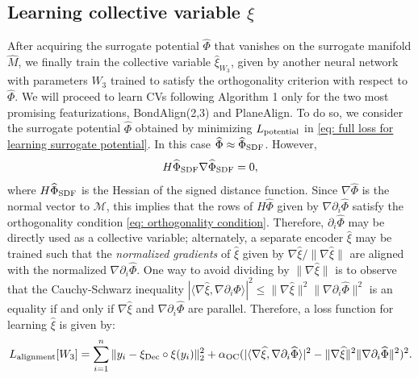 \documentclass[reqno, 12pt]{article}
\begin{document}
\subsection{Learning collective variable $\xi$} After acquiring the surrogate potential $\widehat{\Phi}$ that vanishes on the surrogate manifold $\widehat{M}$, we finally train the collective variable $\widehat{\xi}_{W_3}$, given by another neural network with parameters $W_3$ trained to satisfy the orthogonality criterion with respect to $\widehat{\Phi}$. We will proceed to learn CVs following Algorithm 1 only for the two most promising featurizations, {\sf BondAlign(2,3)} and {\sf PlaneAlign}. To do so, we consider the surrogate potential $\widehat{\Phi}$ obtained by minimizing $L_{\rm potential}$ in \eqref{eq: full loss for learning surrogate potential}. In this case $\widehat{\Phi} \approx \widehat{\Phi}_{\rm SDF}$.  However, 
\begin{equation}\label{eq:HessPhiGradPhi}H\widehat{\Phi}_{\rm SDF}\nabla \widehat{\Phi}_{\rm SDF} = 0,
\end{equation}
where $H\widehat{\Phi}_{\rm SDF}$ is the Hessian of the signed distance function. Since $\nabla\widehat{\Phi}$ is the normal vector to $\mathcal{M}$, this implies that the rows of $H\widehat{\Phi}$ given by $\nabla \partial_{i}\widehat{\Phi}$ satisfy the orthogonality condition \eqref{eq: orthogonality condition}. Therefore, $\partial_{i}\widehat{\Phi}$ may be directly used as a collective variable; alternately, a separate encoder $\widehat{\xi}$ may be trained such that the \emph{normalized gradients} of $\widehat{\xi}$ given by $\nabla \widehat{\xi}/\|\nabla \widehat{\xi}\|$ are aligned with the normalized $\nabla \partial_{i}\widehat{\Phi}$. One way to avoid dividing by $\|\nabla \widehat{\xi}\|$ is to observe that the Cauchy-Schwarz inequality $|\langle\nabla \widehat{\xi}, \nabla \partial_{i}\widehat{ \Phi}\rangle|^2 \leq \|\nabla \widehat{\xi}\|^2\|\nabla { \partial_{i}}\widehat{\Phi}\|^2$ is an equality if and only if $\nabla \widehat{\xi}$ and  $ \nabla \partial_{i} \widehat{\Phi}$ are parallel. Therefore, a loss function for learning $\widehat{\xi}$ is given by: 
\begin{align}
    L_{\rm alignment}[W_3] = \sum_{i=1}^{n}\|y_i - \xi_{\rm Dec}\circ \xi(y_i)\|^{2}_{2} + \alpha_{\rm OC}(|\langle\nabla \widehat{\xi}, \nabla \partial_{i}\widehat{\Phi}\rangle|^2 - \|\nabla\widehat{\xi}\|^2\| \nabla \partial_{i}\widehat{ \Phi}\|^2)^2. \label{eq: L alignment loss}
\end{align}
\end{document}
